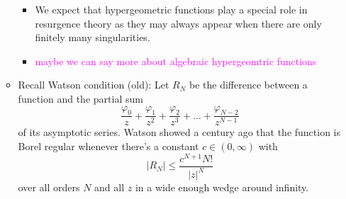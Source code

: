 \documentclass{article}
\begin{document}
\begin{itemize}
\begin{itemize}
\begin{itemize}
\item We expect that hypergeometric functions play a special role in resurgence theory as they may always appear when there are only finitely many singularities.
\item \textcolor{magenta}{maybe we can say more about algebraic hypergeomtric functions}
\end{itemize}
\item Recall Watson condition (old): Let $R_N$ be the difference between a function and the partial sum
\[ \frac{\varphi_0}{z} + \frac{\varphi_1}{z^2} + \frac{\varphi_2}{z^3} + \ldots + \frac{\varphi_{N-2}}{z^{N-1}} \]
of its asymptotic series. Watson showed a century ago that the function is Borel regular whenever there's a constant $c \in (0, \infty)$ with
\[ |R_N| \le \frac{c^{N+1} N!}{|z|^N} \]
over all orders $N$ and all $z$ in a wide enough wedge around infinity.
\end{itemize}
\end{itemize}
\color{DarkBlue}
\end{document}
